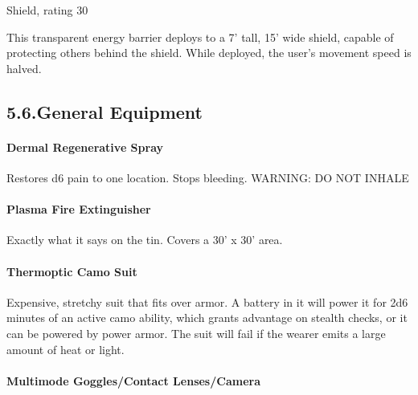 \documentclass{article}
\begin{document}
\noindent{}Shield, rating 30%

This transparent energy barrier deploys to a 7' tall, 15' wide shield, capable of protecting others behind the shield. While deployed, the user's movement speed is halved.%

\subsection{5.6.\hspace*{0.5em}General Equipment}\label{sec-general-equipment}%

\paragraph{Dermal Regenerative Spray}\label{sec-dermal-regenerative-spray}%

\noindent{}Restores d6 pain to one location. Stops bleeding. WARNING: DO NOT INHALE%

\paragraph{Plasma Fire Extinguisher}\label{sec-plasma-fire-extinguisher}%

\noindent{}Exactly what it says on the tin. Covers a 30' x 30' area.%

\paragraph{Thermoptic Camo Suit}\label{sec-thermoptic-camo-suit}%

\noindent{}Expensive, stretchy suit that fits over armor. A battery in it will power it for 2d6 minutes of an active camo ability, which grants advantage on stealth checks, or it can be powered by power armor. The suit will fail if the wearer emits a large amount of heat or light.%

\paragraph{Multimode Goggles/Contact Lenses/Camera}\label{sec-multimode-gogglescontact-lensescamera}%
\end{document}
